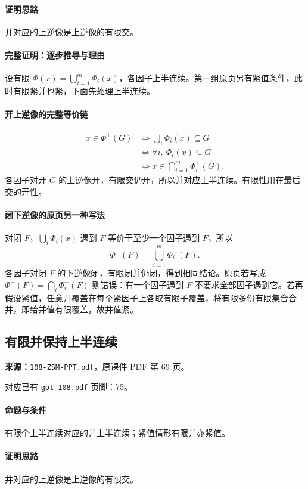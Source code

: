 \paragraph{证明思路}并对应的上逆像是上逆像的有限交。
\paragraph{完整证明：逐步推导与理由}

设有限 $\Phi(x)=\bigcup_{i=1}^m\Phi_i(x)$，各因子上半连续。第一组原页另有紧值条件，此时有限紧并也紧，下面先处理上半连续。
\paragraph{开上逆像的完整等价链}
\begin{align*}
x\in\Phi^+(G)&\iff\bigcup_i\Phi_i(x)\subseteq G\\
&\iff\forall i,\ \Phi_i(x)\subseteq G\\
&\iff x\in\bigcap_{i=1}^m\Phi_i^+(G).
\end{align*}
各因子对开 $G$ 的上逆像开，有限交仍开，所以并对应上半连续。有限性用在最后交的开性。
\paragraph{闭下逆像的原页另一种写法}
对闭 $F$，$\bigcup_i\Phi_i(x)$ 遇到 $F$ 等价于至少一个因子遇到 $F$，所以
\[\Phi^-(F)=\bigcup_{i=1}^m\Phi_i^-(F).\]
各因子对闭 $F$ 的下逆像闭，有限闭并仍闭，得到相同结论。原页若写成 $\Phi^-(F)=\bigcap_i\Phi_i^-(F)$ 则错误：有一个因子遇到 $F$ 不要求全部因子遇到它。若再假设紧值，任意开覆盖在每个紧因子上各取有限子覆盖，将有限多份有限集合合并，即给并值有限覆盖，故并值紧。

\clearpage\subsection{有限并保持上半连续}
\textbf{来源：}\texttt{108-ZSM-PPT.pdf}，原课件 PDF 第 69 页。\par
对应已有 \texttt{gpt-108.pdf} 页脚：75。\par
\paragraph{命题与条件}有限个上半连续对应的并上半连续；紧值情形有限并亦紧值。
\paragraph{证明思路}并对应的上逆像是上逆像的有限交。
